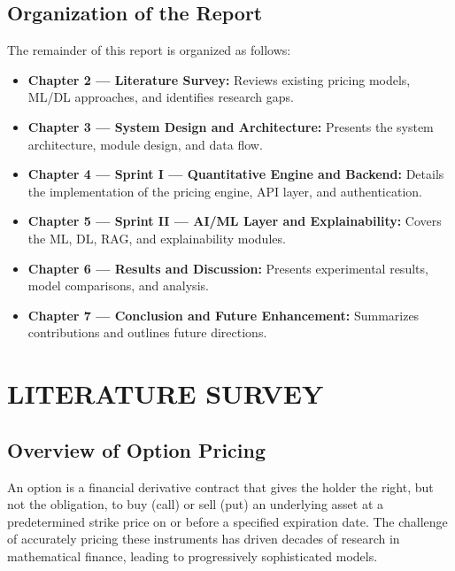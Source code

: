 \documentclass[12pt,a4paper]{report}
\begin{document}
\section{Organization of the Report}

The remainder of this report is organized as follows:

\begin{itemize}
    \item \textbf{Chapter 2 --- Literature Survey:} Reviews existing pricing models, ML/DL approaches, and identifies research gaps.
    \item \textbf{Chapter 3 --- System Design and Architecture:} Presents the system architecture, module design, and data flow.
    \item \textbf{Chapter 4 --- Sprint I --- Quantitative Engine and Backend:} Details the implementation of the pricing engine, API layer, and authentication.
    \item \textbf{Chapter 5 --- Sprint II --- AI/ML Layer and Explainability:} Covers the ML, DL, RAG, and explainability modules.
    \item \textbf{Chapter 6 --- Results and Discussion:} Presents experimental results, model comparisons, and analysis.
    \item \textbf{Chapter 7 --- Conclusion and Future Enhancement:} Summarizes contributions and outlines future directions.
\end{itemize}



\chapter{LITERATURE SURVEY}

\section{Overview of Option Pricing}

An option is a financial derivative contract that gives the holder the right, but not the obligation, to buy (call) or sell (put) an underlying asset at a predetermined strike price on or before a specified expiration date. The challenge of accurately pricing these instruments has driven decades of research in mathematical finance, leading to progressively sophisticated models.
\end{document}
